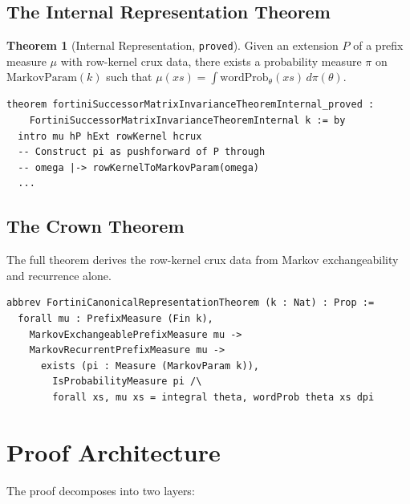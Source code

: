 \documentclass[11pt,a4paper]{article}
\theoremstyle{definition}
\newtheorem{theorem}{Theorem}[section]
\begin{document}
\subsection{The Internal Representation Theorem}

\begin{theorem}[Internal Representation, \texttt{proved}]
\label{thm:internal}
Given an extension $P$ of a prefix measure $\mu$ with row-kernel crux data,
there exists a probability measure $\pi$ on $\mathrm{MarkovParam}(k)$ such that
$\mu(xs) = \int \mathrm{wordProb}_\theta(xs) \, d\pi(\theta)$.
\end{theorem}

\begin{lstlisting}
theorem fortiniSuccessorMatrixInvarianceTheoremInternal_proved :
    FortiniSuccessorMatrixInvarianceTheoremInternal k := by
  intro mu hP hExt rowKernel hcrux
  -- Construct pi as pushforward of P through
  -- omega |-> rowKernelToMarkovParam(omega)
  ...
\end{lstlisting}

\subsection{The Crown Theorem}

The full theorem derives the row-kernel crux data from Markov exchangeability
and recurrence alone.

\begin{lstlisting}
abbrev FortiniCanonicalRepresentationTheorem (k : Nat) : Prop :=
  forall mu : PrefixMeasure (Fin k),
    MarkovExchangeablePrefixMeasure mu ->
    MarkovRecurrentPrefixMeasure mu ->
      exists (pi : Measure (MarkovParam k)),
        IsProbabilityMeasure pi /\
        forall xs, mu xs = integral theta, wordProb theta xs dpi
\end{lstlisting}

\section{Proof Architecture}

The proof decomposes into two layers:
\end{document}
